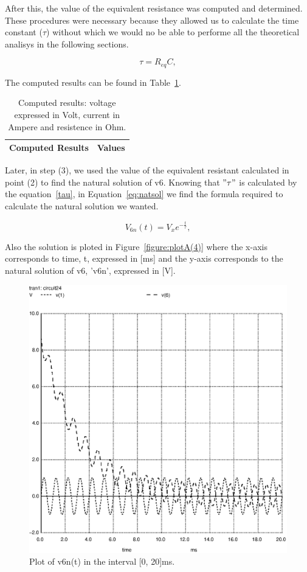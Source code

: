After this, the value of the equivalent resistance was computed and determined. These procedures were necessary because they allowed us to calculate the time constant ($\tau$) without which we would no be able to performe all the theoretical analisys in the following sections. 

\begin{equation}
  \tau = R_{eq}C,
  \label{eq:tau}
\end{equation}


The computed results can be found in Table~\ref{tab:TA2}.

\begin{table}[h]
  \centering
  \begin{tabular}{|l|r|}
    \hline    
    {\bf Computed Results} & {\bf Values} \\ \hline
    
  \end{tabular}
  \caption{Computed results: voltage expressed in Volt, current in Ampere and resistence in Ohm.}
  \label{tab:TA2}
\end{table}

Later, in step (3), we used the value of the equivalent resistant calculated in point (2) to find the natural solution of v6. Knowing that $"\tau"$ is calculated by the equation~\ref{tau}, in Equation~\ref{eq:natsol} we find the formula required to calculate the natural solution we wanted. 

\begin{equation}
  V_{6n}(t) = V_{x}e^{-\frac{t}{\tau}},
  \label{eq:natsol}
\end{equation}

Also the solution is ploted in Figure~\ref{figure:plotA(4)} where the x-axis corresponds to time, t, expressed in [ms] and the y-axis corresponds to the natural solution of v6, 'v6n', expressed in [V].

\begin{figure}[h] \centering
\includegraphics[width=0.8\linewidth]{forcedsolution.eps}
\caption{Plot of v6n(t) in the interval [0, 20]ms.}
\label{fig:plotA(4)}
\end{figure}

